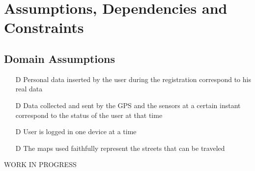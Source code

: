 \documentclass[../../rasd.tex]{subfiles}
\begin{document}
\section{Assumptions, Dependencies and Constraints}
		\subsection{Domain Assumptions}
			 	\begin{itemize}
				 	\item[D\subs{1}]Personal data inserted by the user during the registration correspond to his real data
					\item[D\subs{2}]Data collected and sent by the GPS and the sensors at a certain instant correspond to the status of the user at that time
				
					\item[D\subs{3}]User is logged in one device at a time

					\item[D\subs{4}]The maps used faithfully represent the streets that can be traveled
					
				\end{itemize}
		WORK IN PROGRESS
		
\end{document}
